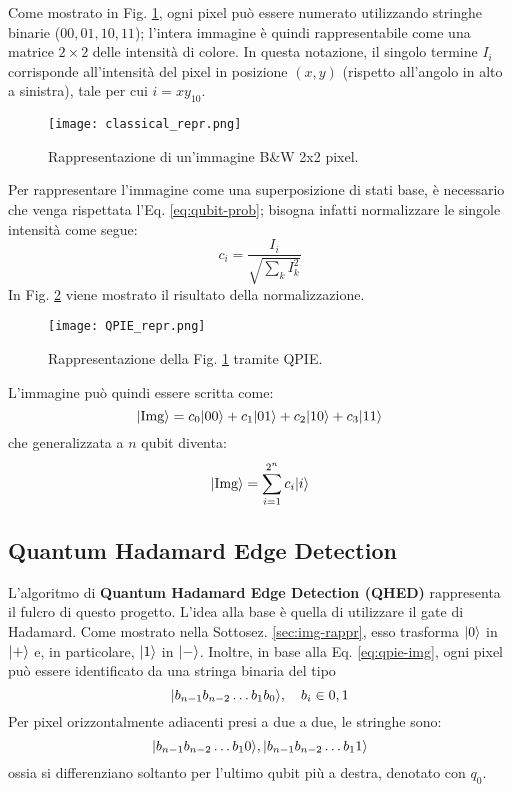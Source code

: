 Come mostrato in Fig.
\ref{fig:bw-4x4-img},
ogni pixel può essere numerato utilizzando stringhe binarie ($00,01,10,11$);
l'intera immagine è quindi
rappresentabile come una matrice $2\times2$ delle intensità di colore. In questa
notazione, il singolo termine $I_{i}$ corrisponde all'intensità del pixel in posizione
$(x,y)$ (rispetto all'angolo in alto a sinistra), tale per cui $i = {xy}_{10}$.
\begin{figure}[ht!]
    \centering
    \texttt{[image: classical\_repr.png]}
		\caption{Rappresentazione di un'immagine B\&W 2x2 pixel.}
    \label{fig:bw-4x4-img}
\end{figure}

Per rappresentare l'immagine come una superposizione di stati base, è necessario
che venga rispettata l'Eq. \ref{eq:qubit-prob}; bisogna infatti normalizzare le singole intensità come segue:
\begin{equation}
	c_i = \frac{I_i}{\sqrt{\sum_{k}^{}{I_{k}^2}}}
	\label{eq:intensities-norm}
\end{equation}
In Fig. \ref{fig:bw-4x4-img-qpie}
viene mostrato il risultato della normalizzazione.
\begin{figure}[ht!]
    \centering
    \texttt{[image: QPIE\_repr.png]}
		\caption{Rappresentazione della Fig. \ref{fig:bw-4x4-img} tramite QPIE.}
    \label{fig:bw-4x4-img-qpie}
\end{figure}

L'immagine può quindi essere scritta come:
\begin{equation*}
	\lvert\text{Img}\rangle
		= c_0 \lvert00\rangle + c_1 \lvert01\rangle + c_2 \lvert10\rangle + c_3 \lvert11\rangle
	\label{eq:qpie-img-2qubit}
\end{equation*}
che generalizzata a $n$ qubit diventa:
\begin{equation}
	\lvert\text{Img}\rangle
		= \sum_{i=1}^{2^n} c_i \lvert i\rangle
	\label{eq:qpie-img}
\end{equation}


\subsection{Quantum Hadamard Edge Detection}

L'algoritmo di \textbf{Quantum Hadamard Edge Detection (QHED)} \cite{qpie} rappresenta il
fulcro di questo progetto. L'idea alla base è quella di utilizzare il gate di
Hadamard. Come mostrato nella Sottosez.
\ref{sec:img-rappr}, esso trasforma
$\lvert0\rangle$ in $\lvert+\rangle$ e, in particolare, $\lvert1\rangle$ in $\lvert-\rangle$. Inoltre, in
base alla Eq. \ref{eq:qpie-img}, ogni pixel può essere identificato
da una stringa binaria del tipo 
\[
	\lvert b_{n-1}b_{n-2}\ldots b_1b_0\rangle,\quad b_i \in {0,1}
\]
Per pixel orizzontalmente adiacenti presi a due a due, le stringhe sono:
\[
	\lvert b_{n-1}b_{n-2}\ldots b_10\rangle, \lvert b_{n-1}b_{n-2}\ldots b_11\rangle
\]
ossia si differenziano soltanto per l'ultimo qubit più a destra, denotato con $q_0$.

